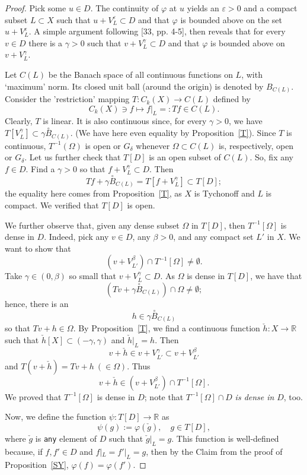 \documentclass[12pt]{amsart}
\theoremstyle{plain}
\theoremstyle{definition}
\theoremstyle{remark}
\def\ee{\varepsilon}
\def\R{{\mathbb R}}
\def\vv{\varphi}
\def\ee{\varepsilon}
\def\ee{\varepsilon}
\begin{document}
\begin{proof}
Pick some $u\in D$. The continuity of $\vv$ at $u$ yields an $\ee>0$ and a compact subset $L\subset X$ such that $u+V^\ee_L \subset D$ and that $\vv$ is bounded above on the set $u+V^{\ee}_L$.
A simple argument following [33, pp. 4-5], then reveals that
for every $v\in D$ there is a $\gamma>0$ such that $v+ V^{\gamma}_L \subset D$ and that
$\vv$ is bounded above on $v+ V^{\gamma}_L$.

\smallskip

Let $C(L)$ be the Banach space of all continuous functions on $L$, with `maximum' norm. Its closed unit ball (around the origin) is denoted by $B_{C(L)}$. Consider the 'restriction' mapping $T: C_k(X)\to C(L)$ defined by
$$
C_k(X)\ni f\longmapsto f|_L=:Tf \in C(L).
$$
Clearly, $T$ is linear. It is also continuous since, for every $\gamma>0$, we have $T[V^\gamma_L]\subset
\gamma\!\!\stackrel \circ B_{C(L)}$. (We have here even equality by Proposition~\ref{T}). Since $T$ is continuous, $T^{-1}(\Omega)$ is open or $G_\delta$
whenever $\Omega\subset C(L)$ is, respectively, open or $G_\delta$. Let us further check that $T[D]$ is an open subset of $C(L)$.
So, fix any $f\in D$. Find a $\gamma>0$ so that $f+ V^\gamma_L\subset D$. Then
$$
Tf +\gamma\!\!\stackrel \circ B_{C(L)} = T[f+ V^\gamma_L] \subset T[D];
$$
the equality here comes from Proposition~\ref{T}, as $X$ is Tychonoff and $L$ is compact.
We verified that $T[D]$ is open.

We further observe that, given any dense subset $\Omega$
in $T[D]$, then $T^{-1}[\Omega]$ is dense in $D$. Indeed,
pick any $v\in D$, any $\beta>0$, and any compact set $L'$ in $X$. We want to show that $$(v+V^\beta_{L'})\cap T^{-1}
[\Omega]\neq\emptyset.$$ Take $\gamma\in(0,\beta)$ so small that $v+V^{\gamma}_L\subset D$.
As $\Omega$ is dense in $T[D]$, we have that
$$
(Tv+\gamma\!\! \stackrel \circ B_{C(L)})\cap \Omega\neq\emptyset;
$$
hence, there is an $$h\in \gamma\!\! \stackrel \circ B_{C(L)}$$ so that $Tv+h\in\Omega$.
By Proposition~\ref{T},
we find a continuous function $\check h:X\to\R$ such that
$\check h[X] \subset (-\gamma,\gamma)$ and $\check h|_L=h$. Then $$v+\check h \in v + V^{\gamma}_{L'} \subset v + V^{\beta}_{L'}$$
and $T(v+\check h)=Tv + h\ (\in\Omega)$. Thus $$v+\check h\in (v+V^\beta_{L'})\cap T^{-1}[\Omega].$$
We proved that $T^{-1}[\Omega]$ is dense in $D$; note that $T^{-1}[\Omega]\cap D$ {\sl is dense in} $D$, too.

Now, we define the function $\psi: T[D]\to\R$ as
$$
\psi(g):=\vv(\check g),\quad g\in T[D],
$$
where $\check g$ is {\tt any} element of $D$ %
such that $\check g|_L=g$.
This function is well-defined because, %
if $f, f'\in D$ and $f|_L=f'|_L=g$, then by the Claim from the proof of Proposition~\ref{SY}, $\vv(f)=\vv(f')$.


\end{proof}
\end{document}

